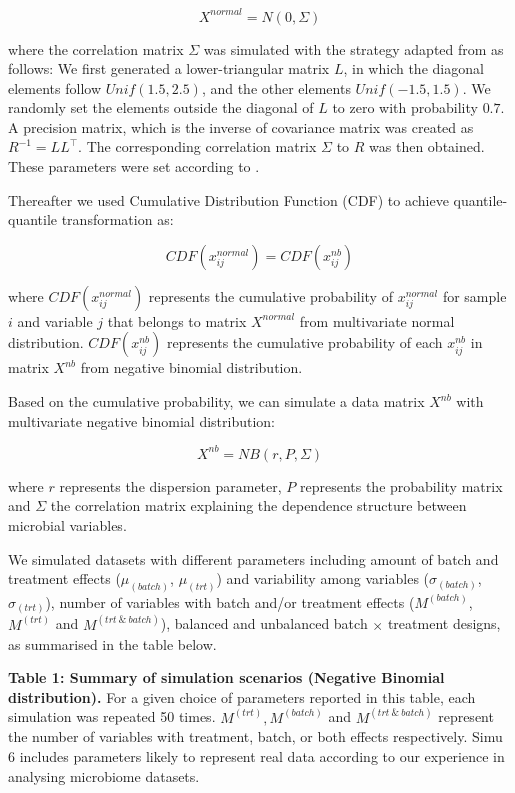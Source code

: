 \documentclass[
]{book}
\begin{document}
\[X^{normal} = N(0, \Sigma)\]

\noindent where the correlation matrix \(\Sigma\) was simulated with the strategy adapted from \citep{mcgregor2020mdine} as follows: We first generated a lower-triangular matrix \(L\), in which the diagonal elements follow \(Unif(1.5, 2.5)\), and the other elements \(Unif(-1.5, 1.5)\). We randomly set the elements outside the diagonal of \(L\) to zero with probability \(0.7\). A precision matrix, which is the inverse of covariance matrix was created as \(R^{-1} = LL^{\top}\). The corresponding correlation matrix \(\Sigma\) to \(R\) was then obtained. These parameters were set according to \citep{mcgregor2020mdine}.

Thereafter we used Cumulative Distribution Function (CDF) to achieve quantile-quantile transformation as:

\[CDF(x^{normal}_{ij}) = CDF(x^{nb}_{ij})\]

\noindent where \(CDF(x^{normal}_{ij})\) represents the cumulative probability of \(x^{normal}_{ij}\) for sample \(i\) and variable \(j\) that belongs to matrix \(X^{normal}\) from multivariate normal distribution. \(CDF(x^{nb}_{ij})\) represents the cumulative probability of each \(x^{nb}_{ij}\) in matrix \(X^{nb}\) from negative binomial distribution.

Based on the cumulative probability, we can simulate a data matrix \(X^{nb}\) with multivariate negative binomial distribution:

\[X^{nb} = NB(r, P, \Sigma)\]

\noindent where \(r\) represents the dispersion parameter, \(P\) represents the probability matrix and \(\Sigma\) the correlation matrix explaining the dependence structure between microbial variables.

We simulated datasets with different parameters including amount of batch and treatment effects (\(\mu_{(batch)}\), \(\mu_{(trt)}\)) and variability among variables (\(\sigma_{(batch)}\), \(\sigma_{(trt)}\)), number of variables with batch and/or treatment effects (\(M^{(batch)}\), \(M^{(trt)}\) and \(M^{(trt \ \& \ batch)}\)), balanced and unbalanced batch \(\times\) treatment designs, as summarised in the table below.

\textbf{Table 1: Summary of simulation scenarios (Negative Binomial distribution).} For a given choice of parameters reported in this table, each simulation was repeated 50 times. \(M^{(trt)}, M^{(batch)}\) and \(M^{(trt \ \& \ batch)}\) represent the number of variables with treatment, batch, or both effects respectively. Simu 6 includes parameters likely to represent real data according to our experience in analysing microbiome datasets.
\end{document}
